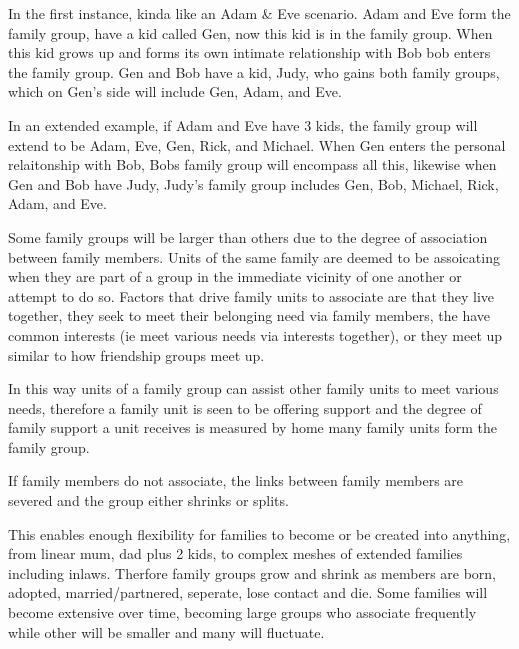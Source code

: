 In the first instance, kinda like an Adam & Eve scenario. Adam and Eve form the family group, have a kid called Gen, now this kid is in the family group. When this kid grows up and forms its own intimate relationship with Bob bob enters the family group. Gen and Bob have a kid, Judy, who gains both family groups, which on Gen's side will include Gen, Adam, and Eve.

In an extended example, if Adam and Eve have 3 kids, the family group will extend to be Adam, Eve, Gen, Rick, and Michael. When Gen enters the personal relaitonship with Bob, Bobs family group will encompass all this, likewise when Gen and Bob have Judy, Judy's family group includes Gen, Bob, Michael, Rick, Adam, and Eve.   

Some family groups will be larger than others due to the degree of association between family members. Units of the same family are deemed to be assoicating when they are part of a group in the immediate vicinity of one another or attempt to do so. Factors that drive family units to associate are that they live together, they seek to meet their belonging need via family members, the have common interests (ie meet various needs via interests together), or they meet up similar to how friendship groups meet up. 

In this way units of a family group can assist other family units to meet various needs, therefore a family unit is seen to be offering support and the degree of family support a unit receives is measured by home many family units form the family group. 

If family members do not associate, the links between family members are severed and the group either shrinks or splits.



This enables enough flexibility for families to become or be created into anything, from linear mum, dad plus 2 kids, to complex meshes of extended families including inlaws. Therfore family groups grow and shrink as members are born, adopted, married/partnered, seperate, lose contact and die. Some families will become extensive over time, becoming large groups who associate frequently while other will be smaller and many will fluctuate.

